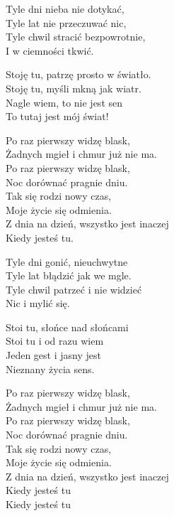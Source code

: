 \begin{text}
    Tyle dni nieba nie dotykać,\\
    Tyle lat nie przeczuwać nic,\\
    Tyle chwil stracić bezpowrotnie,\\
    I w ciemności tkwić.

    Stoję tu, patrzę prosto w światło.\\
    Stoję tu, myśli mkną jak wiatr.\\
    Nagle wiem, to nie jest sen\\
    To tutaj jest mój świat!

    Po raz pierwszy widzę blask,\\
    Żadnych mgieł i chmur już nie ma.\\
    Po raz pierwszy widzę blask,\\
    Noc dorównać pragnie dniu.\\
    Tak się rodzi nowy czas,\\
    Moje życie się odmienia.\\
    Z dnia na dzień, wszystko jest inaczej\\
    Kiedy jesteś tu.

    Tyle dni gonić, nieuchwytne\\
    Tyle lat błądzić jak we mgle.\\
    Tyle chwil patrzeć i nie widzieć\\
    Nic i mylić się.

    Stoi tu, słońce nad słońcami\\
    Stoi tu i od razu wiem\\
    Jeden gest i jasny jest\\
    Nieznany życia sens.


    Po raz pierwszy widzę blask,\\
    Żadnych mgieł i chmur już nie ma.\\
    Po raz pierwszy widzę blask,\\
    Noc dorównać pragnie dniu.\\
    Tak się rodzi nowy czas,\\
    Moje życie się odmienia.\\
    Z dnia na dzień, wszystko jest inaczej\\
    Kiedy jesteś tu\\
	\hfill\break
    Kiedy jesteś tu  

\end{text}
